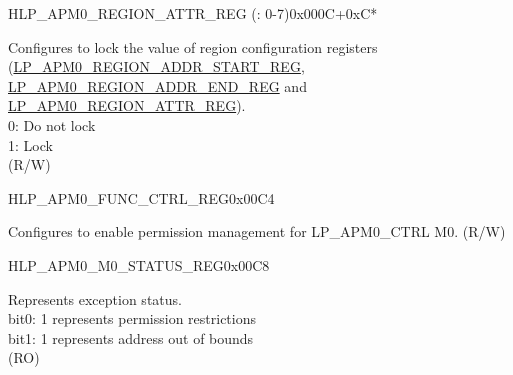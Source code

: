 \begin{register}{H}{LP\_APM0\_REGION\_ATTR\_REG (: 0-7)}{0x000C+0xC*}
\begin{regdesc}
\begin{reglist}
\label{fielddesc:LPAPM0REGIONNLOCK}\item [LP\_APM0\_REGION\regindex{n}\_LOCK] Configures to lock the value of region  configuration registers (\hyperref[regdesc:LPAPM0REGIONNADDRSTARTREG]{LP\_APM0\_REGION\_ADDR\_START\_REG}, \hyperref[regdesc:LPAPM0REGIONNADDRENDREG]{LP\_APM0\_REGION\_ADDR\_END\_REG} and \hyperref[regdesc:LPAPM0REGIONNATTRREG]{LP\_APM0\_REGION\_ATTR\_REG}).\\
0: Do not lock \\
1: Lock  \\ (R/W)
\end{reglist}\end{regdesc}
\end{register}


\begin{register}{H}{LP\_APM0\_FUNC\_CTRL\_REG}{0x00C4}\label{regdesc:LPAPM0FUNCCTRLREG}
%
%
\regnewline%
\begin{regdesc}\begin{reglist}
\label{fielddesc:LPAPM0M0FUNCEN}\item [LP\_APM0\_M0\_FUNC\_EN] Configures to enable permission management for LP\_APM0\_CTRL M0. (R/W)
\end{reglist}\end{regdesc}
\end{register}


\begin{register}{H}{LP\_APM0\_M0\_STATUS\_REG}{0x00C8}\label{regdesc:LPAPM0M0STATUSREG}
%
%
\regnewline%
\begin{regdesc}\begin{reglist}
\label{fielddesc:LPAPM0M0EXCEPTIONSTATUS}\item [LP\_APM0\_M0\_EXCEPTION\_STATUS] Represents exception status.\\
bit0: 1 represents permission restrictions \\
bit1: 1 represents address out of bounds  \\
(RO)
\end{reglist}\end{regdesc}
\end{register}


